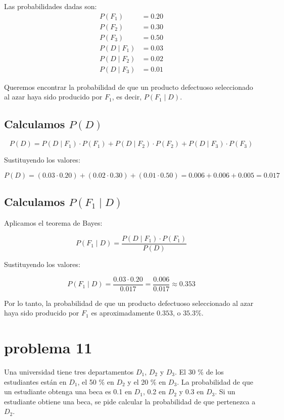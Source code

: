 \documentclass[12pt,a4paper]{article}
\begin{document}
Las probabilidades dadas son:
\begin{align*}
P(F_1) &= 0.20 \\
P(F_2) &= 0.30 \\
P(F_3) &= 0.50 \\
P(D \mid F_1) &= 0.03 \\
P(D \mid F_2) &= 0.02 \\
P(D \mid F_3) &= 0.01
\end{align*}

Queremos encontrar la probabilidad de que un producto defectuoso seleccionado al azar haya sido producido por \( F_1 \), es decir, \( P(F_1 \mid D) \).

\subsection*{Calculamos \( P(D) \)}

\[
P(D) = P(D \mid F_1) \cdot P(F_1) + P(D \mid F_2) \cdot P(F_2) + P(D \mid F_3) \cdot P(F_3)
\]

Sustituyendo los valores:

\[
P(D) = (0.03 \cdot 0.20) + (0.02 \cdot 0.30) + (0.01 \cdot 0.50) = 0.006 + 0.006 + 0.005 = 0.017
\]

\subsection*{Calculamos \( P(F_1 \mid D) \)}

Aplicamos el teorema de Bayes:

\[
P(F_1 \mid D) = \frac{P(D \mid F_1) \cdot P(F_1)}{P(D)}
\]

Sustituyendo los valores:

\[
P(F_1 \mid D) = \frac{0.03 \cdot 0.20}{0.017} = \frac{0.006}{0.017} \approx 0.353
\]

Por lo tanto, la probabilidad de que un producto defectuoso seleccionado al azar haya sido producido por \( F_1 \) es aproximadamente \( 0.353 \), o \( 35.3\% \).

\section*{problema 11}
Una universidad tiene tres departamentos \( D_1 \), \( D_2 \) y \( D_3 \). El 30 \% de los estudiantes están en \( D_1 \), el 50 \% en \( D_2 \) y el 20 \% en \( D_3 \). La probabilidad de que un estudiante obtenga una beca es 0.1 en \( D_1 \), 0.2 en \( D_2 \) y 0.3 en \( D_3 \). Si un estudiante obtiene una beca, se pide calcular la probabilidad de que pertenezca a \( D_2 \).
\end{document}
